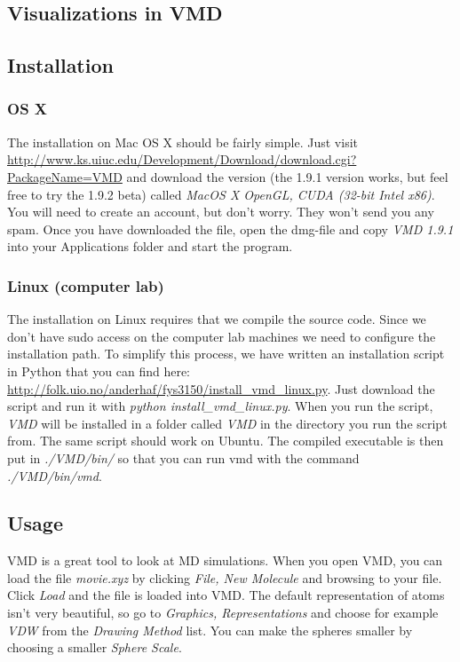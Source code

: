 \documentclass[11pt,a4wide]{article}
\begin{document}
\begin{appendices}
\section{Visualizations in VMD}
\subsection{Installation}
\subsubsection{OS X}
The installation on Mac OS X should be fairly simple. Just visit \url{http://www.ks.uiuc.edu/Development/Download/download.cgi?PackageName=VMD} and download the version (the 1.9.1 version works, but feel free to try the 1.9.2 beta) called \textit{MacOS X OpenGL, CUDA (32-bit Intel x86)}. You will need to create an account, but don't worry. They won't send you any spam. Once you have downloaded the file, open the dmg-file and copy \textit{VMD 1.9.1} into your Applications folder and start the program.
\subsubsection{Linux (computer lab)}
The installation on Linux requires that we compile the source code. Since we don't have sudo access on the computer lab machines we need to configure the installation path. To simplify this process, we have written an installation script in Python that you can find here: \url{http://folk.uio.no/anderhaf/fys3150/install_vmd_linux.py}. Just download the script and run it with \textit{python install\_vmd\_linux.py}. When you run the script, \textit{VMD} will be installed in a folder called \textit{VMD} in the directory you run the script from. The same script should work on Ubuntu. The compiled executable is then put in \textit{./VMD/bin/} so that you can run vmd with the command \textit{./VMD/bin/vmd}.

\subsection{Usage}
VMD is a great tool to look at MD simulations. When you open VMD, you can load the file \textit{movie.xyz} by clicking \textit{File, New Molecule} and browsing to your file. Click \textit{Load} and the file is loaded into VMD. The default representation of atoms isn't very beautiful, so go to \textit{Graphics, Representations} and choose for example \textit{VDW} from the \textit{Drawing Method} list. You can make the spheres smaller by choosing a smaller \textit{Sphere Scale}.

\end{appendices}
\end{document}
